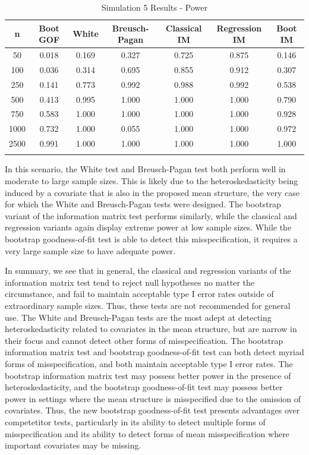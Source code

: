 \documentclass[sn-mathphys-ay]{sn-jnl}
\begin{document}
\begin{table}[h]
\caption{Simulation 5 Results - Power}\label{sim5tab}%
\begin{tabular}{ c|c|c|c|c|c|c}
\toprule
n & Boot GOF & White & Breusch-Pagan & Classical IM & Regression IM & Boot IM \\
\midrule
50 & 0.018 & 0.169 & 0.327 & 0.725 & 0.875 & 0.146 \\
100 & 0.036 & 0.314 & 0.695 & 0.855 & 0.912 & 0.307 \\
250 & 0.141 & 0.773 & 0.992 & 0.988 & 0.992 & 0.538 \\
500 & 0.413 & 0.995 & 1.000 & 1.000 & 1.000 & 0.790 \\
750 & 0.583 & 1.000 & 1.000 & 1.000 & 1.000 & 0.928 \\
1000 & 0.732 & 1.000 & 0.055 & 1.000 & 1.000 & 0.972 \\
2500 & 0.991 & 1.000 & 1.000 & 1.000 & 1.000 & 1.000 \\
\botrule
\end{tabular}

\end{table}

In this scenario, the White test and Breusch-Pagan test both perform well in moderate to large sample sizes. This is likely due to the heteroskedasticity being induced by a covariate that is also in the 
proposed mean structure, the very case for which the White and Breusch-Pagan tests were designed. The bootstrap variant of the information matrix test performs similarly, while the classical and regression
variants again display extreme power at low sample sizes. While the bootstrap goodness-of-fit test is able to detect this misspecification, it requires a very large sample size to have adequate power.

In summary, we see that in general, the classical and regression variants of the information matrix test tend to reject null hypotheses no matter the circumstance, and fail to maintain acceptable type I error rates outside of extraordinary sample sizes. Thus, these tests are not recommended for general use. The White and Breusch-Pagan tests are the most adept at detecting heteroskedasticity related to covariates in the mean structure, but are narrow in their focus and cannot detect other forms of misspecification. The bootstrap information matrix test and bootstrap goodness-of-fit test can both detect myriad forms of misspecification, and both maintain acceptable type I error rates. The bootstrap information matrix test may possess better power in the presence of heteroskedasticity, and the bootstrap goodness-of-fit test may possess better power in settings where the mean structure is misspecified due to the omission of covariates. Thus, the new bootstrap goodness-of-fit test presents advantages over competetitor tests, particularly in its ability to detect multiple forms of misspecification and its ability to detect forms of mean misspecification where important covariates may be missing.
\end{document}
